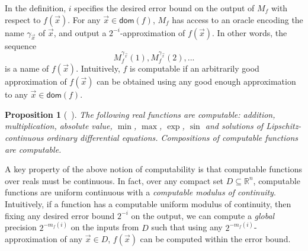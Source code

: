 \documentclass[10pt]{article}
\theoremstyle{plain}
\newtheorem{proposition}[theorem]{Proposition}
\theoremstyle{definition}
\newcommand{\dom}{\mathsf{dom}}
\begin{document}
In the definition, $i$ specifies the desired error bound on the output of $M_f$ with respect to $f(\vec x)$. For any $\vec x\in \dom(f)$, $M_f$ has access to an oracle encoding the name $\gamma_{\vec x}$ of $\vec x$, and output a $2^{-i}$-approximation of $f(\vec x)$. In other words, the sequence 
$$M_f^{\gamma_{\vec x}}(1), M_f^{\gamma_{\vec x}}(2), ... $$
is a name of $f(\vec x)$. Intuitively, $f$ is computable if an arbitrarily good approximation of $f(\vec x)$ can be obtained using any good enough approximation to any $\vec x\in\dom(f)$.
\begin{proposition}[~\cite{CAbook}]
The following real functions are computable: addition, multiplication, absolute value, $\min$, $\max$, $\exp$, $\sin$ and solutions of Lipschitz-continuous ordinary differential equations. Compositions of computable functions are computable.  
\end{proposition}

A key property of the above notion of computability is that computable functions over reals must be continuous. In fact, over any compact set $D\subseteq \mathbb{R}^n$, computable functions are uniform continuous with a {\em computable modulus of continuity}. Intuitively, if a function has a computable uniform modulus of continuity, then fixing any desired error bound $2^{-i}$ on the output, we can compute a {\em global} precision $2^{-m_f(i)}$ on the inputs from $D$ such that using any $2^{-m_f(i)}$-approximation of any $\vec x\in D$, $f(\vec x)$ can be computed within the error bound. 
\end{document}
